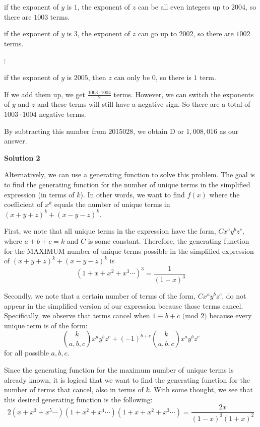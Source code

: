 \begin{enumerate}
 if the exponent of $y$ is $1$, the exponent of $z$ can be all even integers up to $2004$, so there are $1003$ terms.

 if the exponent of $y$ is $3$, the exponent of $z$ can go up to $2002$, so there are $1002$ terms.

 $\vdots$

 if the exponent of $y$ is $2005$, then $z$ can only be 0, so there is $1$ term.

 If we add them up, we get $\frac{1003\cdot1004}{2}$ terms. However, we can switch the exponents of $y$ and $z$ and these terms will still have a negative sign. So there are a total of $1003\cdot1004$ negative terms.

 By subtracting this number from 2015028, we obtain $\boxed{\mathrm{D}}$ or $1,008,016$ as our answer.

 



\textbf{Solution 2}

Alternatively, we can use a \href{https://artofproblemsolving.com/wiki/index.php?title=Generating\_function}{generating function} to solve this problem. The goal is to find the generating function for the number of unique terms in the simplified expression (in terms of $k$). In other words, we want to find $f(x)$ where the coefficient of $x^k$ equals the number of unique terms in $(x+y+z)^k + (x-y-z)^k$.

 
First, we note that all unique terms in the expression have the form, $Cx^ay^bz^c$, where $a+b+c=k$ and $C$ is some constant. Therefore, the generating function for the MAXIMUM number of unique terms possible in the simplified expression of $(x+y+z)^k + (x-y-z)^k$ is
 \[(1+x+x^2+x^3\cdots)^3 = \frac{1}{(1-x)^3}\]

 
Secondly, we note that a certain number of terms of the form, $Cx^ay^bz^c$, do not appear in the simplified version of our expression because those terms cancel. Specifically, we observe that terms cancel when $1 \equiv b+c\text{ (mod }2\text{)}$ because every unique term is of the form:
 \[\binom{k}{a,b,c}x^ay^bz^c+(-1)^{b+c}\binom{k}{a,b,c}x^ay^bz^c\]for all possible $a,b,c$.

 
Since the generating function for the maximum number of unique terms is already known, it is logical that we want to find the generating function for the number of terms that cancel, also in terms of $k$. With some thought, we see that this desired generating function is the following:
 \[2(x+x^3+x^5\cdots)(1+x^2+x^4\cdots)(1+x+x^2+x^3\cdots) = \frac{2x}{(1-x)^3(1+x)^2}\]


\end{enumerate}
